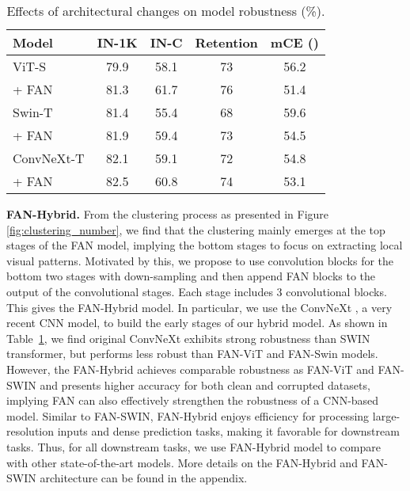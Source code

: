 \documentclass[nohyperref]{article}
\theoremstyle{plain}
\theoremstyle{definition}
\theoremstyle{remark}
\begin{document}
\vspace{-4mm}
\begin{table}[h]
    \small
    \caption{Effects of architectural changes on model robustness (\%).}
    \label{tab:robustness_vit_arch}
    \vspace{2mm}
    \centering
    \setlength{\tabcolsep}{4pt}
    \begin{tabular}{l|cccc}  
    Model      & IN-1K       & IN-C    &  Retention   & mCE ()  
    \\
    \midrule
    ViT-S & 79.9  & 58.1 &  73  & 56.2      
    \\  
    \quad + FAN  &  81.3  & 61.7 &  76  &  51.4
     \\ 
    \midrule
     Swin-T &81.4 &55.4 &68 &  59.6\\
    \quad + FAN  &81.9 &59.4 &73 & 54.5 \\
    \midrule
    ConvNeXt-T &82.1 &59.1 &72 & 54.8 \\
    \quad + FAN & 82.5 & 60.8 & 74 & 53.1
    \end{tabular}
\end{table}

\vspace{-1mm}
\textbf{FAN-Hybrid.}
From the clustering process as presented in Figure \ref{fig:clustering_number}, we find that the clustering mainly emerges   at the top stages of the FAN model, implying the bottom stages to focus on extracting  local visual patterns. Motivated by this,  we  propose to use convolution blocks for the bottom two stages with  down-sampling and then append FAN blocks to the output of the convolutional stages. Each stage includes 3 convolutional blocks. This gives the FAN-Hybrid model. In particular, we use the ConvNeXt \cite{liu2022convnet},  a very recent  CNN model, to build the early stages of our hybrid model. As shown in Table~\ref{tab:robustness_vit_arch}, we find original ConvNeXt exhibits strong robustness than SWIN transformer, but performs less robust than FAN-ViT and FAN-Swin models. However, the FAN-Hybrid achieves comparable robustness as FAN-ViT and FAN-SWIN and presents higher accuracy for both clean and corrupted datasets, implying FAN can also effectively strengthen the robustness of a CNN-based model. Similar to FAN-SWIN, FAN-Hybrid enjoys  efficiency for processing large-resolution inputs and dense prediction tasks, making it favorable    for downstream tasks. Thus, for all downstream tasks, we use FAN-Hybrid model to compare with other state-of-the-art models. More details on the FAN-Hybrid and FAN-SWIN architecture can be found in the appendix. 
\end{document}

